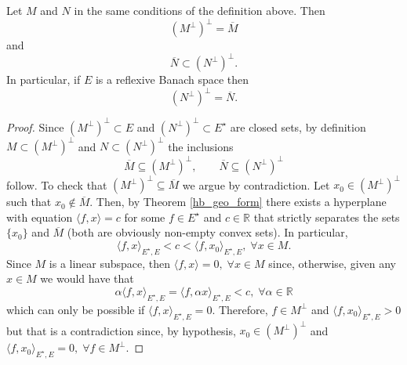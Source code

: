 \begin{lemma}\label{banach_ortho_lemma}
    Let \(M\) and \(N\) in the same conditions of the definition above. Then
    \[
        (M^\perp)^\perp = \overline{M}
    \]
    and
    \[
        \overline{N} \subset (N^\perp)^\perp.
    \]
    In particular, if \(E\) is a reflexive Banach space then
    \[
        (N^\perp)^\perp = \overline{N}.
    \]
\end{lemma}
\begin{proof}
    Since \((M^\perp)^\perp \subset E\) and \((N^\perp)^\perp \subset E^\star\) are closed sets, by definition \(M \subset (M^\perp)^\perp\) and \(N \subset (N^\perp)^\perp\) the inclusions
    \[
        \overline{M} \subseteq (M^\perp)^\perp, \qquad \overline{N} \subseteq (N^\perp)^\perp
    \]
    follow. To check that \((M^\perp)^\perp \subseteq \overline{M}\) we argue by contradiction. Let \(x_0 \in (M^\perp)^\perp\) such that \(x_0 \not \in \overline{M}\). Then, by Theorem \eqref{hb_geo_form} there exists a hyperplane with equation \(\langle f, x \rangle = c\) for some \(f \in E^\star\) and \(c \in \mathbb{R}\) that strictly separates the sets \(\{x_0\}\) and \(\overline{M}\) (both are obviously non-empty convex sets). In particular,
    \[
        \langle f, x \rangle_{E^\star, E} < c < \langle f, x_0 \rangle_{E^\star, E}, \; \forall x \in M.
    \]
    Since \(M\) is a linear subspace, then \(\langle f, x \rangle = 0, \; \forall x \in M\) since, otherwise, given any \(x \in M\) we would have that
    \[
        \alpha \langle f, x \rangle_{E^\star, E} = \langle f, \alpha x \rangle_{E^\star, E} < c, \; \forall \alpha \in \mathbb{R}
    \]
    which can only be possible if \(\langle f, x \rangle_{E^\star, E} = 0\). Therefore, \(f \in M^\perp\) and \(\langle f, x_0 \rangle_{E^\star, E} > 0\) but that is a contradiction since, by hypothesis, \(x_0 \in (M^\perp)^\perp\) and \(\langle f, x_0 \rangle_{E^\star, E} = 0, \; \forall f \in M^\perp\).


\end{proof}
